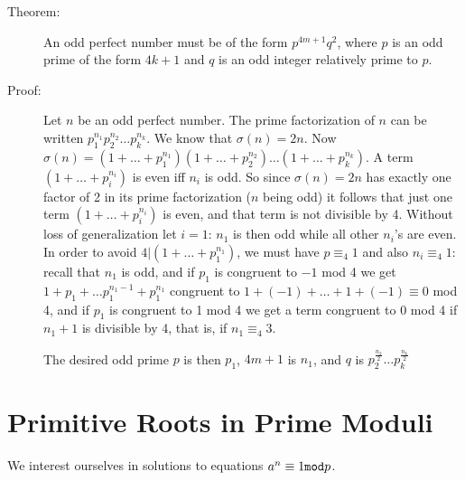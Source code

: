 \documentclass[12pt]{article}
\begin{document}
\begin{description}

\item[Theorem:]  An odd perfect number must be of the form $p^{4m+1}q^2$, where $p$ is an odd prime of the form $4k+1$  and $q$ is an odd integer relatively prime to $p$.

\item[Proof:]  Let $n$ be an odd perfect number.  The prime factorization of $n$ can be written $p_1^{n_1}p_2^{n_2}\ldots p_k^{n_k}$.  We know that $\sigma(n)=2n$.
Now $\sigma(n) = (1+\ldots+p_1^{n_1}) (1+\ldots+p_2^{n_2})\ldots (1+\ldots+p_k^{n_k})$.  A term  $(1+\ldots+p_i^{n_i})$ is even iff $n_i$ is odd.  So since
$\sigma(n)=2n$ has exactly one factor of 2 in its prime factorization ($n$ being odd) it follows that just one term $(1+\ldots+p_i^{n_i})$  is even, and that term is not divisible by 4.
Without loss of generalization let $i=1$:  $n_1$ is then odd while all other $n_i$'s are even.  In order to avoid $4|(1+\ldots+p_1^{n_1})$, we must have $p\equiv_4 1$ and also $n_i \equiv_4 1$:  recall that $n_1$ is odd, and if $p_1$ is congruent to $-1$ mod 4 we get $1+p_1+\ldots p_1^{n_1-1}+p_1^{n_1}$ congruent to $1+(-1)+\ldots+1+(-1) \equiv 0$ mod 4,
and if $p_1$ is congruent to 1 mod 4 we get a term congruent to 0 mod 4 if $n_1+1$ is divisible by 4, that is, if $n_1 \equiv_4 3$.

The desired odd prime $p$ is then $p_1$, $4m+1$ is $n_1$, and $q$ is $p_2^{\frac{n_2}2}\ldots p_k^{\frac{n_k}2}$

\end{description}





\section{Primitive Roots in Prime Moduli}

We interest ourselves in solutions to equations $a^n \equiv 1 {\tt mod} p$.
\end{document}
